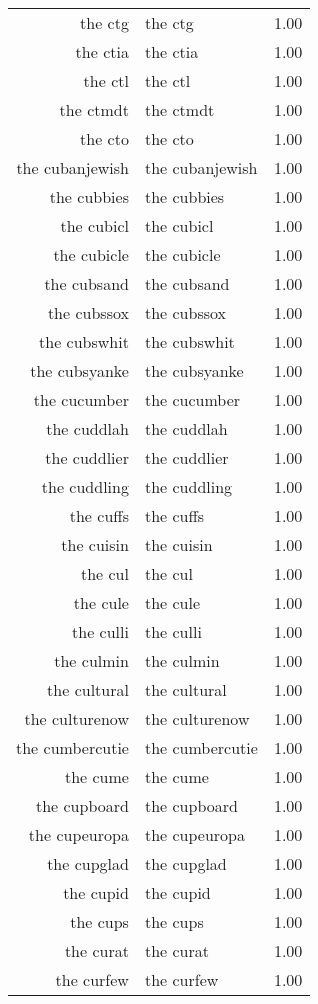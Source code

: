 \begin{table}[ht]
\begin{tabular}{rlr}
  the ctg & the ctg & 1.00 \\ 
  the ctia & the ctia & 1.00 \\ 
  the ctl & the ctl & 1.00 \\ 
  the ctmdt & the ctmdt & 1.00 \\ 
  the cto & the cto & 1.00 \\ 
  the cubanjewish & the cubanjewish & 1.00 \\ 
  the cubbies & the cubbies & 1.00 \\ 
  the cubicl & the cubicl & 1.00 \\ 
  the cubicle & the cubicle & 1.00 \\ 
  the cubsand & the cubsand & 1.00 \\ 
  the cubssox & the cubssox & 1.00 \\ 
  the cubswhit & the cubswhit & 1.00 \\ 
  the cubsyanke & the cubsyanke & 1.00 \\ 
  the cucumber & the cucumber & 1.00 \\ 
  the cuddlah & the cuddlah & 1.00 \\ 
  the cuddlier & the cuddlier & 1.00 \\ 
  the cuddling & the cuddling & 1.00 \\ 
  the cuffs & the cuffs & 1.00 \\ 
  the cuisin & the cuisin & 1.00 \\ 
  the cul & the cul & 1.00 \\ 
  the cule & the cule & 1.00 \\ 
  the culli & the culli & 1.00 \\ 
  the culmin & the culmin & 1.00 \\ 
  the cultural & the cultural & 1.00 \\ 
  the culturenow & the culturenow & 1.00 \\ 
  the cumbercutie & the cumbercutie & 1.00 \\ 
  the cume & the cume & 1.00 \\ 
  the cupboard & the cupboard & 1.00 \\ 
  the cupeuropa & the cupeuropa & 1.00 \\ 
  the cupglad & the cupglad & 1.00 \\ 
  the cupid & the cupid & 1.00 \\ 
  the cups & the cups & 1.00 \\ 
  the curat & the curat & 1.00 \\ 
  the curfew & the curfew & 1.00 \\ 

\end{tabular}
\end{table}
